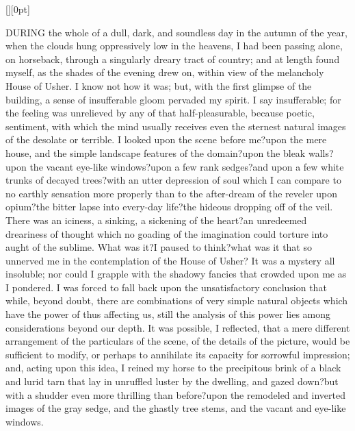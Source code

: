\documentclass[10pt,letterpaper,english]{article}
\newcommand{\baselinegrid}{%
  \raisebox{0pt}[\height][0pt]{\makebox[0pt][l]{%
  \begin{minipage}[t]{\textwidth}%
    \begin{color}{red}%
    \newcounter{ct}
	\forloop{ct}{1}{\value{ct} < 35}
	{
	\rule[1ex]{\linewidth}{1pt}
	\hdashrule[1ex]{\linewidth}{1pt}{4mm}
	\rule[0ex]{\linewidth}{1pt}
	}
    \end{color}
  \end{minipage}%
}}}
\begin{document}
  
  \fontsize{20.74}{1ex}\selectfont
  \setlength{\parskip}{0pt}
  \setlength{\parindent}{0pt}
  
    \baselinegrid
  
  DURING the whole of a dull, dark, and soundless day in the autumn of the year, when the clouds hung oppressively low in the heavens, I had been passing alone, on horseback, through a singularly dreary tract of country; and at length found myself, as the shades of the evening drew on, within view of the melancholy House of Usher. I know not how it was; but, with the first glimpse of the building, a sense of insufferable gloom pervaded my spirit. I say insufferable; for the feeling was unrelieved by any of that half-pleasurable, because poetic, sentiment, with which the mind usually receives even the sternest natural images of the desolate or terrible. I looked upon the scene before me?upon the mere house, and the simple landscape features of the domain?upon the bleak walls?upon the vacant eye-like windows?upon a few rank sedges?and upon a few white trunks of decayed trees?with an utter depression of soul which I can compare to no earthly sensation more properly than to the after-dream of the reveler upon opium?the bitter lapse into every-day life?the hideous dropping off of the veil. There was an iciness, a sinking, a sickening of the heart?an unredeemed dreariness of thought which no goading of the imagination could torture into aught of the sublime. What was it?I paused to think?what was it that so unnerved me in the contemplation of the House of Usher? It was a mystery all insoluble; nor could I grapple with the shadowy fancies that crowded upon me as I pondered. I was forced to fall back upon the unsatisfactory conclusion that while, beyond doubt, there are combinations of very simple natural objects which have the power of thus affecting us, still the analysis of this power lies among considerations beyond our depth. It was possible, I reflected, that a mere different arrangement of the particulars of the scene, of the details of the picture, would be sufficient to modify, or perhaps to annihilate its capacity for sorrowful impression; and, acting upon this idea, I reined my horse to the precipitous brink of a black and lurid tarn that lay in unruffled luster by the dwelling, and gazed down?but with a shudder even more thrilling than before?upon the remodeled and inverted images of the gray sedge, and the ghastly tree stems, and the vacant and eye-like windows.
\end{document}
